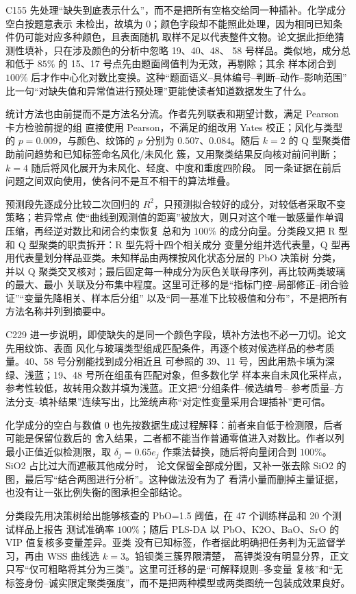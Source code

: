 C155 先处理“缺失到底表示什么”，而不是把所有空格交给同一种插补。化学成分空白按题意表示
未检出，故填为 0；颜色字段却不能照此处理，因为相同已知条件仍可能对应多种颜色，且表面随机
取样不足以代表整件文物。论文据此拒绝猜测性填补，只在涉及颜色的分析中忽略 19、40、48、
58 号样品。类似地，成分总和低于 $85\%$ 的 15、17 号点先由题面阈值判为无效，再剔除；其余
样本闭合到 $100\%$ 后才作中心化对数比变换。这种“题面语义--具体编号--判断--动作--影响范围”
比一句“对缺失值和异常值进行预处理”更能使读者知道数据发生了什么。

统计方法也由前提而不是方法名分流。作者先列联表和期望计数，满足 Pearson 卡方检验前提的组
直接使用 Pearson，不满足的组改用 Yates 校正；风化与类型的 $p=0.009$，与颜色、纹饰的
$p$ 分别为 $0.507$、$0.084$。随后 $k=2$ 的 Q 型聚类借助前问趋势和已知标签命名风化/未风化
簇，又用聚类结果反向核对前问判断；$k=4$ 随后将风化展开为未风化、轻度、中度和重度四阶段。
同一条证据在前后问题之间双向使用，使各问不是互不相干的算法堆叠。

预测段先逐成分比较二次回归的 $R^2$，只预测拟合较好的成分，对较低者采取不变策略；若异常点
使“曲线到观测值的距离”被放大，则只对这个唯一敏感量作单调压缩，再经逆对数比和闭合约束恢复
总和为 $100\%$ 的成分向量。分类段又把 R 型和 Q 型聚类的职责拆开：R 型先将十四个相关成分
变量分组并选代表量，Q 型再用代表量划分样品亚类。未知样品由两棵按风化状态分层的 PbO 决策树
分类，并以 Q 聚类交叉核对；最后固定每一种成分为灰色关联母序列，再比较两类玻璃的最大、最小
关联及分布集中程度。这里可迁移的是“指标门控--局部修正--闭合验证”“变量先降相关、样本后分组”
以及“同一基准下比较极值和分布”，不是把所有方法名称并列到摘要中。

C229 进一步说明，即使缺失的是同一个颜色字段，填补方法也不必一刀切。论文先用纹饰、表面
风化与玻璃类型组成匹配条件，再逐个核对候选样品的参考质量。40、58 号分别能找到成分相近且
可参照的 39、11 号，因此用热卡填为深绿、浅蓝；19、48 号所在组虽有匹配对象，但多数化学
样本来自未风化采样点，参考性较低，故转用众数并填为浅蓝。正文把“分组条件--候选编号--
参考质量--方法分支--填补结果”连续写出，比笼统声称“对定性变量采用合理插补”更可信。

化学成分的空白与数值 0 也先按数据生成过程解释：前者来自低于检测限，后者可能是保留位数后的
舍入结果，二者都不能当作普通零值进入对数比。作者以列最小正值近似检测限，取
$\delta_j=0.65e_j$ 作乘法替换，随后将向量闭合到 $100\%$。SiO2 占比过大而遮蔽其他成分时，
论文保留全部成分图，又补一张去除 SiO2 的图，最后写“结合两图进行分析”。这种做法没有为了
看清小量而删掉主量证据，也没有让一张比例失衡的图承担全部结论。

分类段先用决策树给出能够核查的 PbO=1.5 阈值，在 47 个训练样品和 20 个测试样品上报告
测试准确率 $100\%$；随后 PLS-DA 以 PbO、K2O、BaO、SrO 的 VIP 值复核多变量差异。亚类
没有已知标签，作者据此明确把任务判为无监督学习，再由 WSS 曲线选 $k=3$。铅钡类三簇界限清楚，
高钾类没有明显分界，正文只写“仅可粗略将其分为三类”。这里可迁移的是“可解释规则--多变量
复核”和“无标签身份--诚实限定聚类强度”，而不是把两种模型或两类图统一包装成效果良好。

